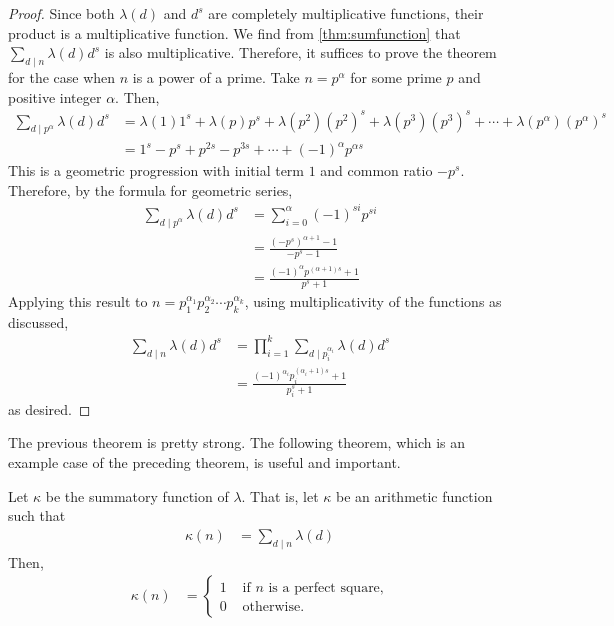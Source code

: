 	\begin{proof}
		Since both $\lambda(d)$ and $d^s$ are completely multiplicative functions, their product is a multiplicative function. We find from \autoref{thm:sumfunction} that $\sum\limits_{d\mid n} \lambda(d) d^s$ is also multiplicative. Therefore, it suffices to prove the theorem for the case when $n$ is a power of a prime. Take $n=p^\alpha$ for some prime $p$ and positive integer $\alpha$. Then,
			\begin{align*}
				\sum_{d\mid p^\alpha} \lambda(d) d^s &= \lambda(1) 1^s + \lambda(p) p^s + \lambda(p^2) \left(p^2\right)^s +\lambda(p^3) \left(p^3\right)^s+ \cdots + \lambda(p^\alpha) \left(p^\alpha \right)^s\\
									 &= 1^s - p^s + p^{2s} - p^{3s} +\cdots + \left(-1\right)^{\alpha} p^{\alpha s}
			\end{align*}
		This is a geometric progression with initial term $1$ and common ratio $-p^s$. Therefore, by the formula for geometric series,
			\begin{align*}
				\sum_{d\mid p^\alpha} \lambda(d) d^s
					& = \sum_{i=0}^{\alpha} (-1)^{si}p^{si}\\
					& = \frac{\left(-p^s\right)^{\alpha + 1} -1}{-p^s -1}\\
					& = \frac{(-1)^\alpha p^{(\alpha + 1)s} + 1}{p^s + 1}
			\end{align*}
		Applying this result to $n= p_1^{\alpha_1} p_2^{\alpha_2} \cdots p_k^{\alpha_k}$, using multiplicativity of the functions as discussed,
			\begin{align*}
				\sum_{d\mid n} \lambda(d) d^s
					&= \prod_{i=1}^{k}\sum_{d\mid p_i^{\alpha_i}} \lambda(d) d^s\\
					&= \frac{(-1)^{\alpha_i} p_i^{(\alpha_i+1)s} + 1}{p_i^s + 1}
			\end{align*}
		as desired.
	\end{proof}
The previous theorem is pretty strong. The following theorem, which is an example case of the preceding theorem, is useful and important.
	\begin{theorem} \label{thm:liouville-sum-function}
		Let $\kappa$ be the summatory function of $\lambda$. That is, let $\kappa$ be an arithmetic function such that
			\begin{align*}
				\kappa (n) & = \sum_{d\mid n}\lambda(d)
			\end{align*}
		Then,
			\begin{align*}
				\kappa(n) & =
					\begin{cases}
						1&\text{ if }n\text{ is a perfect square,}\\
						0&\text{ otherwise.}
					\end{cases}
			\end{align*}
	\end{theorem}

